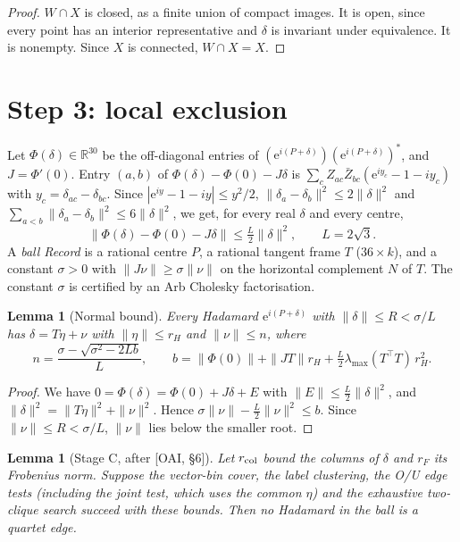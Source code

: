 \documentclass[11pt]{article}
\newtheorem{lemma}[theorem]{Lemma}
\theoremstyle{remark}
\newcommand{\e}{\mathrm e}
\begin{document}
\begin{proof}
$W\cap X$ is closed, as a finite union of compact images. It is open, since every point has an interior representative and $\delta$ is invariant under equivalence. It is nonempty. Since $X$ is connected, $W\cap X=X$.
\end{proof}

\section{Step 3: local exclusion}

Let $\Phi(\delta)\in\mathbb R^{30}$ be the off-diagonal entries of $(\e^{i(P+\delta)})(\e^{i(P+\delta)})^*$, and $J=\Phi'(0)$. Entry $(a,b)$ of $\Phi(\delta)-\Phi(0)-J\delta$ is $\sum_c Z_{ac}\bar Z_{bc}(\e^{iy_c}-1-iy_c)$ with $y_c=\delta_{ac}-\delta_{bc}$. Since $|\e^{iy}-1-iy|\le y^2/2$, $\|\delta_a-\delta_b\|^2\le2\|\delta\|^2$ and $\sum_{a<b}\|\delta_a-\delta_b\|^2\le6\|\delta\|^2$, we get, for every real $\delta$ and every centre,
\[
 \|\Phi(\delta)-\Phi(0)-J\delta\|\le\tfrac L2\|\delta\|^2,\qquad L=2\sqrt3 .
\] A \emph{ball Record} is a rational centre $P$, a rational tangent frame $T$ ($36\times k$), and a constant $\sigma>0$ with $\|J\nu\|\ge\sigma\|\nu\|$ on the horizontal complement $N$ of $T$. The constant $\sigma$ is certified by an Arb Cholesky factorisation.

\begin{lemma}[Normal bound]\label{lem:normal}
Every Hadamard $\e^{i(P+\delta)}$ with $\|\delta\|\le R<\sigma/L$ has $\delta=T\eta+\nu$ with $\|\eta\|\le r_H$ and $\|\nu\|\le n$, where
\[
 n=\frac{\sigma-\sqrt{\sigma^2-2Lb}}{L},\qquad b=\|\Phi(0)\|+\|JT\|r_H+\tfrac L2\lambda_{\max}(T^\top T)\,r_H^2 .
\]
\end{lemma}

\begin{proof}
We have $0=\Phi(\delta)=\Phi(0)+J\delta+E$ with $\|E\|\le\frac L2\|\delta\|^2$, and $\|\delta\|^2=\|T\eta\|^2+\|\nu\|^2$. Hence $\sigma\|\nu\|-\frac L2\|\nu\|^2\le b$. Since $\|\nu\|\le R<\sigma/L$, $\|\nu\|$ lies below the smaller root.
\end{proof}

\begin{lemma}[Stage C, after {[OAI, \S6]}]\label{lem:stagec}
Let $r_{\rm col}$ bound the columns of $\delta$ and $r_F$ its Frobenius norm. Suppose the vector-bin cover, the label clustering, the O/U edge tests (including the joint test, which uses the common $\eta$) and the exhaustive two-clique search succeed with these bounds. Then no Hadamard in the ball is a quartet edge.
\end{lemma}
\end{document}
